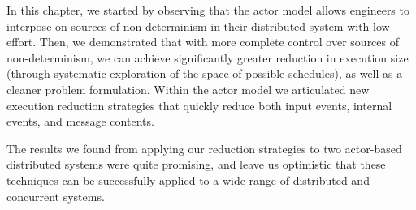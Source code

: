 In this chapter, we started by observing that the actor model allows engineers to interpose
on sources of non-determinism in their distributed system with low effort.
Then, we demonstrated that with
more complete control over sources of non-determinism, we can achieve
significantly greater reduction in execution size (through systematic
exploration of the space of possible schedules), as well as a cleaner
problem formulation. Within the actor model we articulated new execution
reduction
strategies that quickly reduce both input events,
internal events, and message contents.

The results we found from applying our reduction strategies to two actor-based
distributed systems were quite promising, and leave us optimistic that these techniques can be
successfully applied to a wide range of distributed and concurrent systems.

